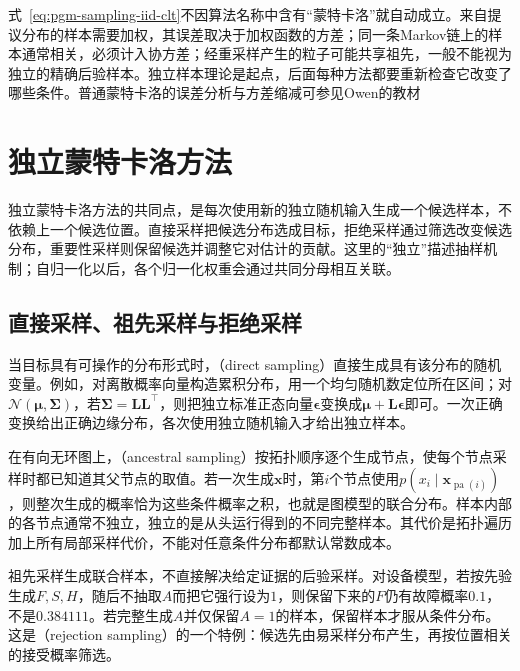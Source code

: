 式~\eqref{eq:pgm-sampling-iid-clt}不因算法名称中含有“蒙特卡洛”就自动成立。来自提议分布的样本需要加权，其误差取决于加权函数的方差；同一条Markov链上的样本通常相关，必须计入协方差；经重采样产生的粒子可能共享祖先，一般不能视为独立的精确后验样本。独立样本理论是起点，后面每种方法都要重新检查它改变了哪些条件。普通蒙特卡洛的误差分析与方差缩减可参见Owen的教材

\section{独立蒙特卡洛方法}
\label{sec:pgm-sampling-independent}

独立蒙特卡洛方法的共同点，是每次使用新的独立随机输入生成一个候选样本，不依赖上一个候选位置。直接采样把候选分布选成目标，拒绝采样通过筛选改变候选分布，重要性采样则保留候选并调整它对估计的贡献。这里的“独立”描述抽样机制；自归一化以后，各个归一化权重会通过共同分母相互关联。

\subsection{直接采样、祖先采样与拒绝采样}
\label{sec:pgm-sampling-direct-rejection}

当目标具有可操作的分布形式时，（direct sampling）直接生成具有该分布的随机变量。例如，对离散概率向量构造累积分布，用一个均匀随机数定位所在区间；对$\mathcal{N}(\bm{\mu},\bm{\Sigma})$，若$\bm{\Sigma}=\bm{L}\bm{L}^{\top}$，则把独立标准正态向量$\bm{\epsilon}$变换成$\bm{\mu}+\bm{L}\bm{\epsilon}$即可。一次正确变换给出正确边缘分布，各次使用独立随机输入才给出独立样本。

在有向无环图上，（ancestral sampling）按拓扑顺序逐个生成节点，使每个节点采样时都已知道其父节点的取值。若一次生成$\bm{x}$时，第$i$个节点使用$p(x_i\mid\bm{x}_{\operatorname{pa}(i)})$，则整次生成的概率恰为这些条件概率之积，也就是图模型的联合分布。样本内部的各节点通常不独立，独立的是从头运行得到的不同完整样本。其代价是拓扑遍历加上所有局部采样代价，不能对任意条件分布都默认常数成本。

祖先采样生成联合样本，不直接解决给定证据的后验采样。对设备模型，若按先验生成$F,S,H$，随后不抽取$A$而把它强行设为$1$，则保留下来的$F$仍有故障概率$0.1$，不是$0.384111$。若完整生成$A$并仅保留$A=1$的样本，保留样本才服从条件分布。这是（rejection sampling）的一个特例：候选先由易采样分布产生，再按位置相关的接受概率筛选。

